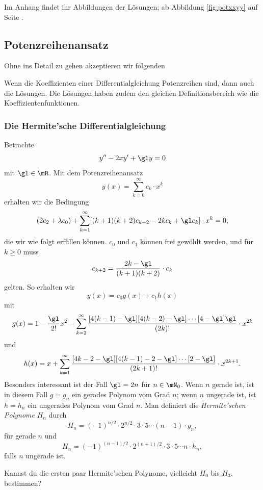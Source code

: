 \documentclass[%
draft,
11pt,%
twoside,%
titlepage,%
german,%
headsepline%
]{scrartcl}
\begin{document}
Im Anhang findet ihr Abbildungen der Lösungen; ab Abbildung \ref{fig:potxxyy} auf Seite \pageref{fig:potxxyy}.

\subsection{Potenzreihenansatz}

Ohne ins Detail zu gehen akzeptieren wir folgenden
\begin{satz}
Wenn
die Koeffizienten einer Differentialgleichung Potenzreihen sind, dann auch die L\"osungen. Die L\"osungen haben zudem den gleichen Definitionsbereich wie die Koeffizientenfunktionen.
\end{satz}

\subsubsection{Die Hermite'sche Differentialgleichung}

Betrachte
\begin{equation}\label{eq:hermit}
y''-2xy'+\gl y=0
\end{equation}
mit $\gl\in\mR$. Mit dem Potenzreihenansatz
$$y(x)=\sum_{k=0}^\infty c_k\cdot x^k$$
erhalten wir die Bedingung
$$
(2c_2+\lambda c_0)
+\sum_{k=1}^\infty[(k+1)(k+2)c_{k+2}-2kc_k+\gl c_k]\cdot x^k=0,
$$
die wir wie folgt erf\"ullen k\"onnen. $c_0$ und $c_1$ k\"onnen frei gew\"ohlt werden, und f\"ur $k\geq0$ muss
$$c_{k+2}=\frac{2k-\gl}{(k+1)(k+2)}\cdot c_k$$
gelten. So erhalten wir
$$y(x)=c_0g(x)+c_1h(x)$$
mit
$$
g(x)=1-\frac{\gl}{2!}x^2
-\sum_{k=2}^\infty\frac{[4(k-1)-\gl][4(k-2)-\gl]\dotsm[4-\gl]\gl}{(2k)!}\cdot x^{2k}
$$
und
$$
h(x)=x
+\sum_{k=1}^\infty\frac{[4k-2-\gl][4(k-1)-2-\gl]\dotsm[2-\gl]}{(2k+1)!}\cdot x^{2k+1}.
$$
Besonders interessant ist der Fall $\gl=2n$ f\"ur $n\in\mN_0$. Wenn $n$ gerade ist, ist in diesem Fall $g=g_n$ ein gerades Polynom vom Grad $n$; wenn $n$ ungerade ist, ist $h=h_n$ ein ungerades Polynom vom Grad $n$. Man definiert die \emph{Hermite'schen Polynome} $H_n$ durch
$$H_n=(-1)^{n/2}\cdot2^{n/2}\cdot3\cdot5\dotsm(n-1)\cdot g_n,$$
f\"ur gerade $n$ und
$$H_n=(-1)^{(n-1)/2}\cdot2^{(n+1)/2}\cdot3\cdot5\dotsm n\cdot h_n,$$
falls $n$ ungerade ist.

\begin{ueb}
Kannst du die ersten paar Hermite'schen Polynome, vielleicht $H_0$ bis $H_3$, bestimmen?
\end{ueb}
\end{document}
